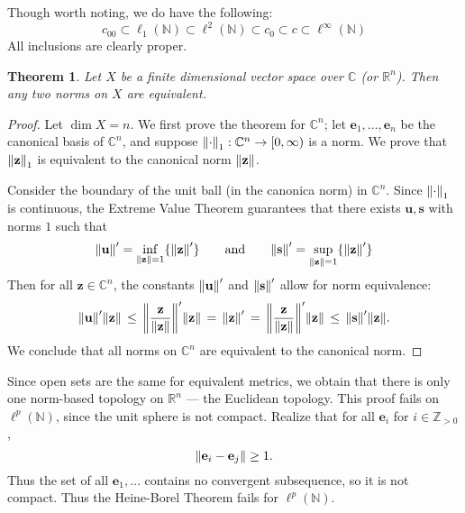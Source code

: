 \documentclass[11pt]{article}
\newtheorem{theorem}{Theorem}
\renewcommand{\vec}[1]{\mathbf{#1}}
\begin{document}
\newpage

Though worth noting, we do have the following:
\[
  c_{00} \subset \ell_{1}(\mathbb{N}) \subset \ell^{2}(\mathbb{N}) \subset c_{0} \subset c \subset \ell^{\infty}(\mathbb{N})
\]
All inclusions are clearly proper.

\begin{theorem}
  Let $X$ be a finite dimensional vector space over $\mathbb{C}$ (or $\mathbb{R}^{n}$). Then any two norms on $X$ are equivalent.
\end{theorem}
\begin{adjustwidth}{0.5cm}{}
  \begin{proof}
    Let $\dim X = n$. We first prove the theorem for $\mathbb{C}^{n}$; let $\vec{e}_{1}, \ldots, \vec{e}_{n}$ be the canonical basis of $\mathbb{C}^{n}$, and suppose $\norm{\cdot}_{1} : \mathbb{C}^{n} \to [0, \infty)$ is a norm. We prove that $\norm{\vec{z}}_{1}$ is equivalent to the canonical norm $\norm{\vec{z}}$.
    
    Consider the boundary of the unit ball (in the canonica norm) in $\mathbb{C}^{n}$. Since $\norm{\cdot}_{1}$ is continuous, the Extreme Value Theorem guarantees that there exists $\vec{u}, \vec{s}$ with norms $1$ such that 
    \[
      \norm{\vec{u}}' = \inf\limits_{\norm{\vec{z}} = 1} \{  \norm{\vec{z}}' \} \qquad \text{and} \qquad \norm{\vec{s}}' = \sup\limits_{\norm{\vec{z}} = 1} \{ \norm{\vec{z}}' \}
    \]
    Then for all $\vec{z} \in \mathbb{C}^{n}$, the constants $\norm{\vec{u}}'$ and $\norm{\vec{s}}'$ allow for norm equivalence:
    \[
      \norm{\vec{u}}' \norm{\vec{z}} \, \le \, \norm{\frac{\vec{z}}{\norm{\vec{z}}}}' \norm{\vec{z}} \, = \, \norm{\vec{z}}' \, = \, \norm{\frac{\vec{z}}{\norm{\vec{z}}}}' \norm{\vec{z}} \, \le \, \norm{\vec{s}}' \norm{\vec{z}}.
    \]
    We conclude that all norms on $\mathbb{C}^{n}$ are equivalent to the canonical norm.


  \end{proof}
\end{adjustwidth}

Since open sets are the same for equivalent metrics, we obtain that there is only one norm-based topology on $\mathbb{R}^{n}$ --- the Euclidean topology. This proof fails on $\ell^{p}(\mathbb{N})$, since the unit sphere is not compact. Realize that for all $\vec{e}_{i}$ for $i \in \mathbb{Z}_{> 0}$,
\[
  \norm{\vec{e}_{i} - \vec{e}_{j}} \ge 1.
\]
Thus the set of all $\vec{e}_{1}, \ldots$ contains no convergent subsequence, so it is not compact. Thus the Heine-Borel Theorem fails for $\ell^{p}(\mathbb{N})$.
\end{document}
